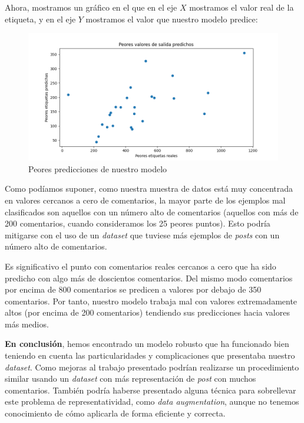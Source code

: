 \documentclass[11pt]{article}
\begin{document}
Ahora, mostramos un gráfico en el que en el eje $X$ mostramos el valor real de la etiqueta, y en el eje $Y$ mostramos el valor que nuestro modelo predice:

\begin{figure}[H]
  \centering
  \includegraphics[width=\textwidth]{where_did_we_failed}
    \caption{Peores predicciones de nuestro modelo}
\end{figure}

Como podíamos suponer, como nuestra muestra de datos está muy concentrada en valores cercanos a cero de comentarios, la mayor parte de los ejemplos mal clasificados son aquellos con un número alto de comentarios (aquellos con más de 200 comentarios, cuando consideramos los 25 peores puntos). Esto podría mitigarse con el uso de un \emph{dataset} que tuviese más ejemplos de \emph{posts} con un número alto de comentarios.

Es significativo el punto con comentarios reales cercanos a cero que ha sido predicho con algo más de doscientos comentarios. Del mismo modo comentarios por encima de 800 comentarios se predicen a valores por debajo de 350 comentarios. Por tanto, nuestro modelo trabaja mal con valores extremadamente altos (por encima de 200 comentarios) tendiendo sus predicciones hacia valores más medios.

\textbf{En conclusión}, hemos encontrado un modelo robusto que ha funcionado bien teniendo en cuenta las particularidades y complicaciones que presentaba nuestro \emph{dataset}. Como mejoras al trabajo presentado podrían realizarse un procedimiento similar usando un \emph{dataset} con más representación de \emph{post} con muchos comentarios. También podría haberse presentado alguna técnica para sobrellevar este problema de representatividad, como \emph{data augmentation}, aunque no tenemos conocimiento de cómo aplicarla de forma eficiente y correcta.
\end{document}
